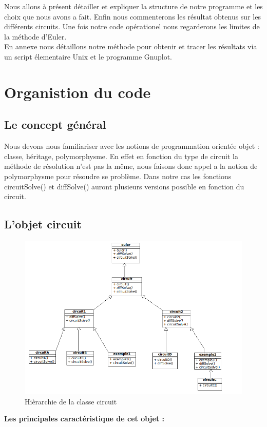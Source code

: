 \documentclass[a4paper,11pt]{article}
\begin{document}
Nous allons à présent détailler et expliquer la structure de notre programme et les choix que nous avons a fait. Enfin nous commenterons les 
résultat obtenus sur les différents circuits. 
Une fois notre code opérationel nous regarderons les limites de la méthode d'Euler.\\
En annexe nous détaillons notre méthode pour obtenir et tracer les résultats via un script élementaire Unix et le programme Gnuplot.
\newpage

\section{Organistion du code}
  \subsection{Le concept général}
  Nous devons nous familiariser avec les notions de programmation orientée objet : classe, héritage, polymorphysme.
  En effet en fonction du type de circuit la méthode de
  résolution n'est pas la même, nous faisons donc appel a la notion de polymorphysme pour résoudre se problème. Dans notre cas les fonctions 
  circuitSolve() et diffSolve() auront plusieurs versions possible en fonction du circuit.
  \subsection{L'objet circuit}
    \begin{figure}[H]
	 \begin{center}
	  \includegraphics[scale=.5]{circuitDiagram}
	\caption{Hièrarchie de la classe circuit}
	\end{center}
      \end{figure}
    \textbf{Les principales caractéristique de cet objet :}\\
\end{document}
